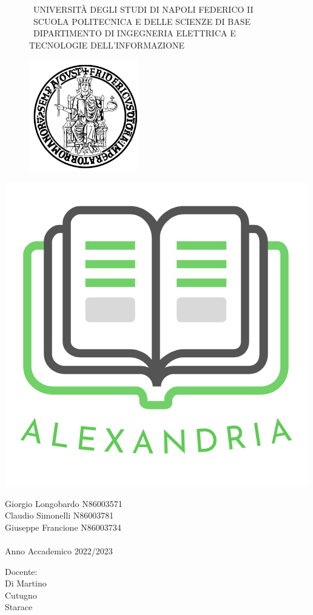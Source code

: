 \documentclass{report}
\begin{document}
    \begin{figure}[htbp!]
    

    \centering\scshape\Medium\ UNIVERSITÀ DEGLI STUDI DI NAPOLI FEDERICO II \\
    \centering\scshape\small\ SCUOLA POLITECNICA E DELLE SCIENZE DI BASE\\
    \centering\scshape\Medium\ DIPARTIMENTO DI INGEGNERIA ELETTRICA E TECNOLOGIE DELL'INFORMAZIONE\\

        \begin{center}
            \includegraphics[width=.30\textwidth]{Immagini/FedericoII.png}
        \end{center}
    \end{figure}
         \begin{center}

            \includegraphics[width=.30\textwidth]{Immagini/Alexandria logo nome medium 2.png} 
        \end{center}
        

    \begin{center}


        Giorgio Longobardo N86003571 \\ Claudio Simonelli N86003781\\ Giuseppe Francione N86003734\\~\\ Anno Accademico 2022/2023
    \end{center}
    
\hspace{0pt}
\vfill
    \raggedleft Docente:\\Di Martino\\Cutugno\\Starace
\vfill
\hspace{0pt}


    
    \newpage

    \tableofcontents

    
    
    
    
    
    
    

    
\end{document}
